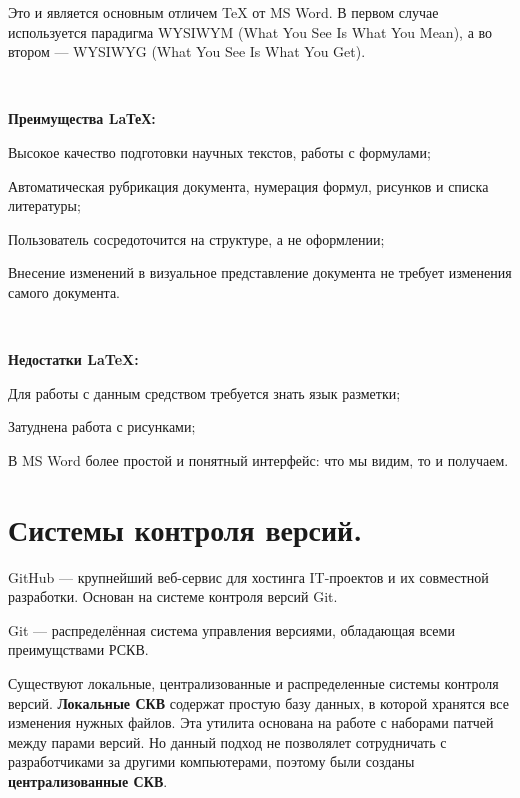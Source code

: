 \documentclass{article}
\begin{document}
Это и является основным отличем TeX от MS Word.
В первом случае используется парадигма WYSIWYM (What You See Is What You Mean), а во втором  — WYSIWYG (What You See Is What You Get).

~\

\textbf{Преимущества LaТеХ:}
\begin{compactitem}
\item Высокое качество подготовки научных текстов, работы с формулами;
\item Автоматическая рубрикация документа, нумерация формул, рисунков и списка литературы;
\item Пользователь сосредоточится на структуре, а не оформлении;
\item Внесение изменений в визуальное представление документа не требует изменения самого документа.
\end{compactitem}

~\

\textbf{Недостатки LaTeX:}
\begin{compactitem}
\item Для работы с данным средством требуется знать язык разметки;
\item Затуднена работа с рисунками;
\item В MS Word более простой и понятный интерфейс: что мы видим, то и получаем.
\end{compactitem}

\newpage

\section{\textbf{\large Системы контроля версий.}}

GitHub — крупнейший веб-сервис для хостинга IT-проектов и их совместной разработки. Основан на системе контроля версий Git.

Git — распределённая система управления версиями, обладающая всеми преимущствами РСКВ.

Существуют локальные, централизованные и распределенные системы контроля версий.
\textbf{Локальные СКВ} содержат простую базу данных, в которой хранятся все изменения нужных файлов. Эта утилита основана на работе с наборами патчей между парами версий. Но данный подход не позволялет сотрудничать с разработчиками за другими компьютерами, поэтому были созданы \textbf{централизованные СКВ}.
\end{document}
